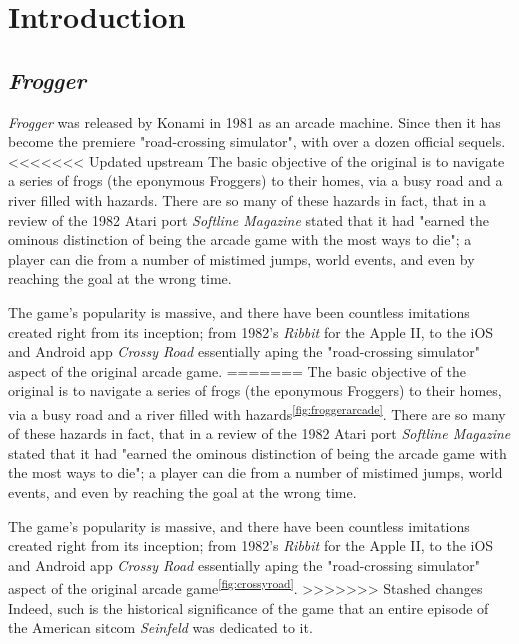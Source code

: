 \documentclass[12pt, a4paper]{report}
\begin{document}
\maketitle

\tableofcontents
\pagebreak

\section{Introduction}
\subsection{\textit{Frogger}}
\textit{Frogger} was released by Konami in 1981 as an arcade machine.
Since then it has become the premiere "road-crossing simulator", with over a dozen official sequels.
<<<<<<< Updated upstream
The basic objective of the original is to navigate a series of frogs (the eponymous Froggers) to their homes, via a busy road and a river filled with hazards.
There are so many of these hazards in fact, that in a review of the 1982 Atari port \textit{Softline Magazine} stated that it had "earned the ominous distinction of being the arcade game with the most ways to die"\cite{softline}; a player can die from a number of mistimed jumps, world events, and even by reaching the goal at the wrong time.
\par
The game's popularity is massive, and there have been countless imitations created right from its inception; from 1982's \textit{Ribbit} for the Apple II, to the iOS and Android app \textit{Crossy Road} essentially aping the "road-crossing simulator" aspect of the original arcade game.
=======
The basic objective of the original is to navigate a series of frogs (the eponymous Froggers) to their homes, via a busy road and a river filled with hazards\textsuperscript{\ref{fig:froggerarcade}}.
There are so many of these hazards in fact, that in a review of the 1982 Atari port \textit{Softline Magazine} stated that it had "earned the ominous distinction of being the arcade game with the most ways to die"\cite{softline}; a player can die from a number of mistimed jumps, world events, and even by reaching the goal at the wrong time.
\par
The game's popularity is massive, and there have been countless imitations created right from its inception; from 1982's \textit{Ribbit} for the Apple II, to the iOS and Android app \textit{Crossy Road} essentially aping the "road-crossing simulator" aspect of the original arcade game\textsuperscript{\ref{fig:crossyroad}}.
>>>>>>> Stashed changes
Indeed, such is the historical significance of the game that an entire episode of the American sitcom \textit{Seinfeld} was dedicated to it\cite{seinfeld}.
\end{document}
